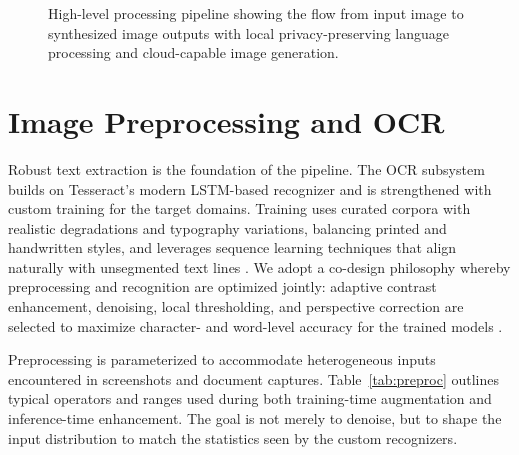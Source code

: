 \begin{figure}[t]
  \centering
  \caption{High-level processing pipeline showing the flow from input image to synthesized image outputs with local privacy-preserving language processing and cloud-capable image generation.}
  \label{fig:pipeline-overview}
\end{figure}

\section{Image Preprocessing and OCR}

Robust text extraction is the foundation of the pipeline. The OCR subsystem builds on Tesseract's modern LSTM-based recognizer \cite{smith2007overview, hochreiter1997long} and is strengthened with custom training for the target domains. Training uses curated corpora with realistic degradations and typography variations, balancing printed and handwritten styles, and leverages sequence learning techniques that align naturally with unsegmented text lines \cite{graves2006connectionist}. We adopt a co-design philosophy whereby preprocessing and recognition are optimized jointly: adaptive contrast enhancement, denoising, local thresholding, and perspective correction are selected to maximize character- and word-level accuracy for the trained models \cite{esser2020improving}.

Preprocessing is parameterized to accommodate heterogeneous inputs encountered in screenshots and document captures. Table~\ref{tab:preproc} outlines typical operators and ranges used during both training-time augmentation and inference-time enhancement. The goal is not merely to denoise, but to shape the input distribution to match the statistics seen by the custom recognizers.


